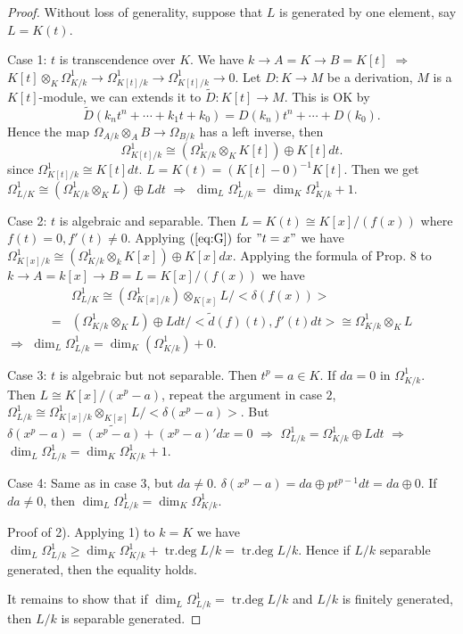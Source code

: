 \documentclass[cs4size]{article}
\newcommand{\inv}{^{-1}}
\newcommand{\ra}{\rightarrow}
\newcommand{\Ra}{\Rightarrow}
\DeclareMathOperator{\trdeg}{tr.deg}
\begin{document}
\begin{proof}
Without loss of generality, suppose that $L$ is generated by one element, say $L=K(t)$.

Case 1: $t$ is transcendence over $K$. We have $k\ra A=K\ra B=K[t]$ $\Ra$ $K[t]\otimes_K\Omega_{K/k}^1\ra \Omega_{K[t]/k}^1\ra\Omega_{K[t]/k}^1\ra 0$.
Let $D: K\ra M$ be a derivation, $M$ is a $K[t]$-module, we can extends it to $\tilde{D}: K[t]\ra M$. This is OK by \[\tilde{D}(k_nt^n+\cdots+k_1t+k_0)=D(k_n)t^n+\cdots+D(k_0).\]
Hence the map $\Omega_{A/k}\otimes_AB\ra \Omega_{B/k}$ has a left inverse, then
\begin{equation}
\Omega_{K[t]/k}^1\cong (\Omega_{K/k}^1\otimes_KK[t])\oplus K[t]dt.\label{eq:G}
\end{equation}
since $\Omega_{K[t]/k}^1\cong K[t]dt$. $L=K(t)=(K[t]-0)\inv K[t]$. Then we get $\Omega_{L/K}^1\cong (\Omega_{K/k}^1\otimes_KL)\oplus Ldt$ $\Ra$ $\dim_L\Omega_{L/k}^1=\dim_K\Omega_{K/k}^1+1.$

Case 2: $t$ is algebraic and separable. Then $L=K(t)\cong K[x]/(f(x))$ where $f(t)=0, f'(t)\neq 0$. Applying $(\ref{eq:G})$ for $"t=x"$ we have $\Omega_{K[x]/k}^1\cong (\Omega_{K/k}^1\otimes_kK[x])\oplus K[x]dx$. Applying the formula of Prop. 8 to $k\ra A=k[x]\ra B=L=K[x]/(f(x))$ we have
\begin{align*}
&\Omega_{L/K}^1\cong (\Omega_{K[x]/k}^1)\otimes_{K[x]}L/<\delta(f(x))>\\
=&(\Omega_{K/k}^1\otimes_KL)\oplus Ldt/<\tilde{d}(f)(t),f'(t)dt>\cong \Omega_{K/k}^1\otimes_KL
\end{align*}
$\Ra$ $\dim_L\Omega_{L/k}^1=\dim_K(\Omega_{K/k}^1)+0$.

Case 3: $t$ is algebraic but not separable. Then $t^p=a\in K$. If $da=0$ in $\Omega_{K/k}^1.$ Then $L\cong K[x]/(x^p-a)$, repeat the argument in case $2$, $\Omega_{L/k}^1\cong \Omega_{K[x]/k}^1\otimes_{K[x]}L/<\delta(x^p-a)>$. But $\delta(x^p-a)=\widetilde{(x^p-a)}+(x^p-a)'dx=0$ $\Ra$ $\Omega_{L/k}^1=\Omega_{K/k}^1\oplus Ldt$ $\Ra$ $\dim_L\Omega_{L/k}^1=\dim_K\Omega_{K/k}^1+1.$

Case 4: Same as in case 3, but $da\neq 0$. $\delta(x^p-a)=da\oplus pt^{p-1}dt=da\oplus0$. If $da\neq 0$, then $\dim_L\Omega_{L/k}^1=\dim_K\Omega_{K/k}^1$.

Proof of 2). Applying 1) to $k=K$ we have $\dim_L\Omega_{L/k}^1\geq \dim_K\Omega_{K/k}^1+\trdeg L/k=\trdeg L/k$. Hence if $L/k$ separable generated, then the equality holds.

It remains to show that if $\dim_L\Omega_{L/k}^1=\trdeg L/k$ and $L/k$ is finitely generated, then $L/k$ is separable generated.


\end{proof}
\end{document}
